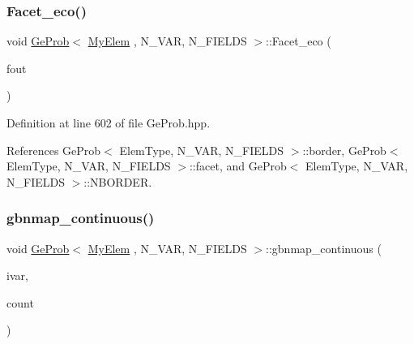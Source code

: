 \mbox{\label{classGeProb_ae30b85570c7c33bb4429f9ed91532807}} 
\subsubsection{\texorpdfstring{Facet\+\_\+eco()}{Facet\_eco()}}
{\footnotesize\ttfamily void \hyperlink{classGeProb}{Ge\+Prob}$<$ \hyperlink{DG__Prob_8h_a83cd887ced9a6587428f267e50cd4787}{My\+Elem} , N\+\_\+\+V\+AR, N\+\_\+\+F\+I\+E\+L\+DS $>$\+::Facet\+\_\+eco (\begin{DoxyParamCaption}\item[{F\+I\+LE $\ast$}]{fout }\end{DoxyParamCaption})\hspace{0.3cm}{\ttfamily [inherited]}}



Definition at line 602 of file Ge\+Prob.\+hpp.



References Ge\+Prob$<$ Elem\+Type, N\+\_\+\+V\+A\+R, N\+\_\+\+F\+I\+E\+L\+D\+S $>$\+::border, Ge\+Prob$<$ Elem\+Type, N\+\_\+\+V\+A\+R, N\+\_\+\+F\+I\+E\+L\+D\+S $>$\+::facet, and Ge\+Prob$<$ Elem\+Type, N\+\_\+\+V\+A\+R, N\+\_\+\+F\+I\+E\+L\+D\+S $>$\+::\+N\+B\+O\+R\+D\+ER.

\mbox{\label{classGeProb_aa2d34febad6985ceacd95ba6e10536f8}} 
\subsubsection{\texorpdfstring{gbnmap\+\_\+continuous()}{gbnmap\_continuous()}\hspace{0.1cm}{\footnotesize\ttfamily [1/2]}}
{\footnotesize\ttfamily void \hyperlink{classGeProb}{Ge\+Prob}$<$ \hyperlink{DG__Prob_8h_a83cd887ced9a6587428f267e50cd4787}{My\+Elem} , N\+\_\+\+V\+AR, N\+\_\+\+F\+I\+E\+L\+DS $>$\+::gbnmap\+\_\+continuous (\begin{DoxyParamCaption}\item[{const int \&}]{ivar,  }\item[{int \&}]{count }\end{DoxyParamCaption})\hspace{0.3cm}{\ttfamily [inherited]}}



